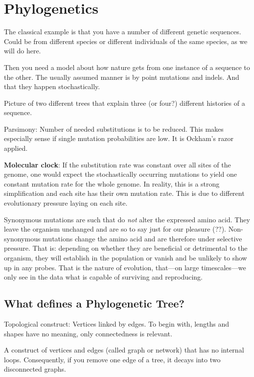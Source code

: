 \documentclass[12pt]{scrartcl}
\begin{document}
\section{Phylogenetics}

  The classical example is that you have a number of different genetic sequences. Could be from different species or different individuals of the same species, as we will do here.

  Then you need a model about how nature gets from one instance of a sequence to the other. The usually assumed manner is by point mutations and indels. And that they happen stochastically.

  Picture of two different trees that explain three (or four?) different histories of a sequence.

  Parsimony: Number of needed substitutions is to be reduced. This makes especially sense if single mutation probabilities are low. It is Ockham's razor applied.

  \textbf{Molecular clock}: If the substitution rate was constant over all sites of the genome, one would expect the stochastically occurring mutations to yield one constant mutation rate for the whole genome. In reality, this is a strong simplification and each site has their own mutation rate. This is due to different evolutionary pressure laying on each site.

  Synonymous mutations are such that do \textit{not} alter the expressed amino acid. They leave the organism unchanged and are so to say just for our pleasure (??). Non-synonymous mutations change the amino acid and are therefore under selective pressure. That is: depending on whether they are beneficial or detrimental to the organism, they will establish in the population or vanish and be unlikely to show up in any probes. That is the nature of evolution, that---on large timescales---we only see in the data what is capable of surviving and reproducing.

  \subsection{What defines a Phylogenetic Tree?}

  Topological construct: Vertices linked by edges. To begin with, lengths and shapes have no meaning, only connectedness is relevant.

  A construct of vertices and edges (called graph or network) that has no internal loops. Consequently, if you remove one edge of a tree, it decays into two disconnected graphs.
\end{document}

